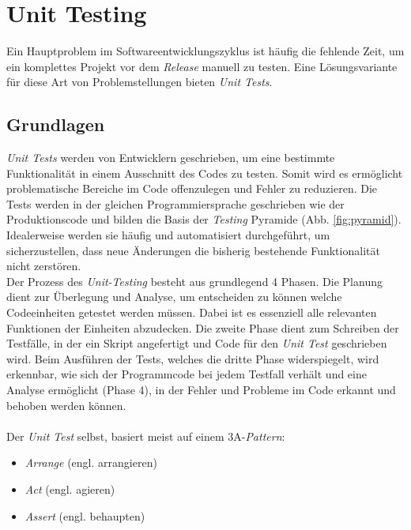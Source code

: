 \section{Unit Testing}
Ein Hauptproblem im Softwareentwicklungszyklus ist häufig die fehlende Zeit, um ein komplettes Projekt vor dem \textit{Release} manuell zu testen. \cite*{SoftwareQualityLab} Eine Lösungsvariante für diese Art von Problemstellungen bieten \textit{Unit Tests}. 

\subsection{Grundlagen}
\textit{Unit Tests} werden von Entwicklern geschrieben, um eine bestimmte Funktionalität in einem Ausschnitt des Codes zu testen. Somit wird es ermöglicht problematische Bereiche im Code offenzulegen und Fehler zu reduzieren. \cite*{tosunEffectivenessUnitTests2018} Die Tests werden in der gleichen Programmiersprache geschrieben wie der Produktionscode und bilden die Basis der \textit{Testing} Pyramide (Abb. \ref{fig:pyramid}). Idealerweise werden sie häufig und automatisiert durchgeführt, um sicherzustellen, dass neue Änderungen die bisherig bestehende Funktionalität nicht zerstören. \cite*{TestingPyramidStrategic2024}\\
Der Prozess des \textit{Unit-Testing} besteht aus grundlegend 4 Phasen. Die Planung dient zur Überlegung und Analyse, um entscheiden zu können welche Codeeinheiten getestet werden müssen. Dabei ist es essenziell alle relevanten Funktionen der Einheiten abzudecken. \cite*{bakharevUnitTestingDefinition2023} Die zweite Phase dient zum Schreiben der Testfälle, in der ein Skript angefertigt und Code für den \textit{Unit Test} geschrieben wird. \cite*{bakharevUnitTestingDefinition2023} Beim Ausführen der Tests, welches die dritte Phase widerspiegelt, wird erkennbar, wie sich der Programmcode bei jedem Testfall verhält und eine Analyse ermöglicht (Phase 4), in der Fehler und Probleme im Code erkannt und behoben werden können.\cite*{bakharevUnitTestingDefinition2023}\\\\
Der \textit{Unit Test} selbst, basiert meist auf einem 3A-\textit{Pattern}:
\begin{itemize}
    \setlength{\parskip}{0.5pt}
    \item \textit{Arrange} (engl. arrangieren)
    \item \textit{Act} (engl. agieren)
    \item \textit{Assert} (engl. behaupten)
\end{itemize}

